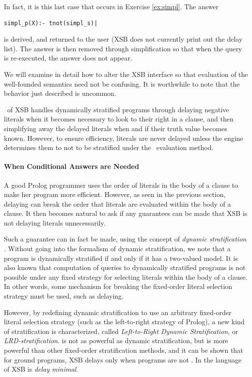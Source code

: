 In fact, it is this last case that occurs in Exercise \ref{ex:simpl}.
The answer
\begin{verbatim}
simpl_p(X):- tnot(simpl_s)|
\end{verbatim}
is derived, and returned to the user (XSB does not currently print out
the delay list).  The answer is then removed through simplification so
that when the query is re-executed, the answer does not appear.

We will examine in detail how to alter the XSB interface so that
evaluation of the well-founded semantics need not be confusing.  It is
worthwhile to note that the behavior just described is uncommon.

\version\ of XSB handles dynamically stratified programs through
delaying negative literals when it becomes necessary to look to their
right in a clause, and then simplifying away the delayed literals when
and if their truth value becomes known.  However, to ensure
efficiency, literals are never delayed unless the engine determines
them to not to be stratified under the \LRD\ evaluation method.

\paragraph{When Conditional Answers are Needed} \label{sec:lrd}

A good Prolog programmer uses the order of literals in the body of a
clause to make her program more efficient.  However, as seen in the
previous section, delaying can break the order that literals are
evaluated within the body of a clause.  It then becomes natural to ask
if any guarantees can be made that XSB is not delaying literals
unnecessarily.

Such a guarantee can in fact be made, using the concept of {\em
dynamic stratification} \cite{Przy89d}.  Without going into the
formalism of dynamic stratification, we note that a program is
dynamically stratified if and only if it has a two-valued model.  It
is also known that computation of queries to dynamically
stratified programs is not possible under any fixed strategy for
selecting literals within the body of a clause.  In other words, some
mechanism for breaking the fixed-order literal selection strategy must
be used, such as delaying.

However, by redefining dynamic stratification to use an arbitrary
fixed-order literal selection strategy (such as the left-to-right
strategy of Prolog), a new kind of stratification is characterized,
called {\em Left-to-Right Dynamic Stratification}, or {\em
LRD-stratification}.  \LRD{} is not as powerful as dynamic
stratification, but is more powerful than other fixed-order
stratification methods, and it can be shown that for ground programs,
XSB delays only when programs are not \LRD.  In the language of
\cite{SaSW99} XSB is {\em delay minimal}.

